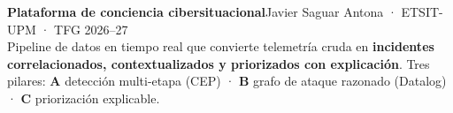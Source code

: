 \documentclass[9pt,a4paper]{extarticle}
\begin{document}
\begin{tcolorbox}[enhanced,colback=azul,colframe=azul,arc=2pt,left=6pt,right=6pt,top=4pt,bottom=4pt]
\color{white}
{\Large\bfseries Plataforma de conciencia cibersituacional}\hfill{\small Javier Saguar Antona · ETSIT-UPM · TFG 2026–27}\\[2pt]
\small Pipeline de datos en tiempo real que convierte telemetría cruda en \textbf{incidentes correlacionados,
contextualizados y priorizados con explicación}. Tres pilares: \textbf{A} detección multi-etapa (CEP) ·
\textbf{B} grafo de ataque razonado (Datalog) · \textbf{C} priorización explicable.
\end{tcolorbox}
\end{document}
